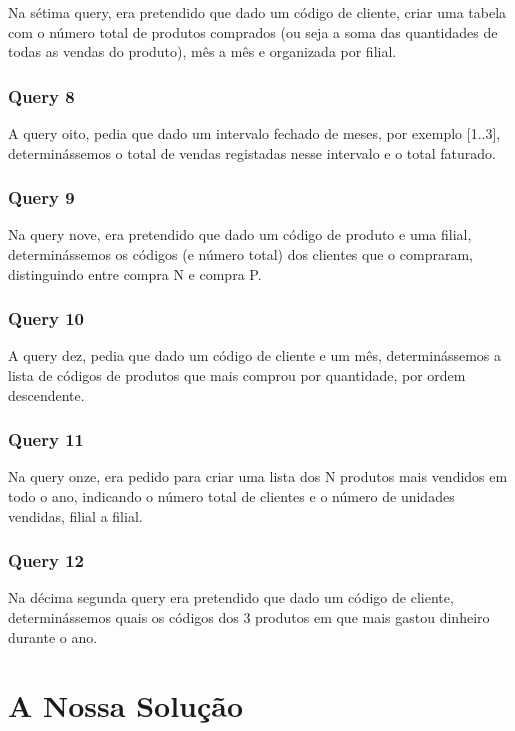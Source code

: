 \documentclass[a4paper,11pt]{report}
\begin{document}
Na sétima query, era pretendido que dado um código de cliente, criar uma tabela com o número total de produtos comprados (ou seja a soma das quantidades de todas as vendas do produto), mês a mês e organizada por filial.

\subsection*{Query 8}
\label{sec:Query8}

A query oito, pedia que dado um intervalo fechado de meses, por exemplo [1..3], determinássemos o total de vendas registadas nesse intervalo e o total faturado.

\subsection*{Query 9}
\label{sec:Query9}

Na query nove, era pretendido que dado um código de produto e uma filial, determinássemos os códigos (e número total) dos clientes que o compraram, distinguindo entre compra N e compra P.

\subsection*{Query 10}
\label{sec:Query10}

A query dez, pedia que dado um código de cliente e um mês, determinássemos a lista de códigos de produtos que mais comprou por quantidade, por ordem descendente.

\subsection*{Query 11}
\label{sec:Query11}

Na query onze, era pedido para criar uma lista dos N produtos mais vendidos em todo o ano, indicando o número total de clientes e o número de unidades vendidas, filial a filial.

\subsection*{Query 12}
\label{sec:Query12}

Na décima segunda query era pretendido que dado um código de cliente, determinássemos quais os códigos dos 3 produtos em que mais gastou dinheiro durante o ano.

\chapter{A Nossa Solução}
\label{sec:solucao}
\end{document}
